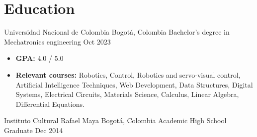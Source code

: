 \section*{Education}
\begin{entrylist}
    \entry
    {Universidad Nacional de Colombia}
    {Bogotá, Colombia}
    {Bachelor’s degree in Mechatronics engineering }
    {Oct 2023}
    {\begin{itemize}
            \item \textbf{GPA:} 4.0 / 5.0
            \item \textbf{Relevant courses:} Robotics, Control, Robotics and servo-visual control, Artificial Intelligence Techniques, Web Development, Data Structures, Digital Systems, Electrical Circuits, Materials Science, Calculus, Linear Algebra, Differential Equations.
        \end{itemize}
    }

    \entry
    {Instituto Cultural Rafael Maya}
    {Bogotá, Colombia}
    {Academic High School Graduate}
    {Dec 2014}
    {}
\end{entrylist}